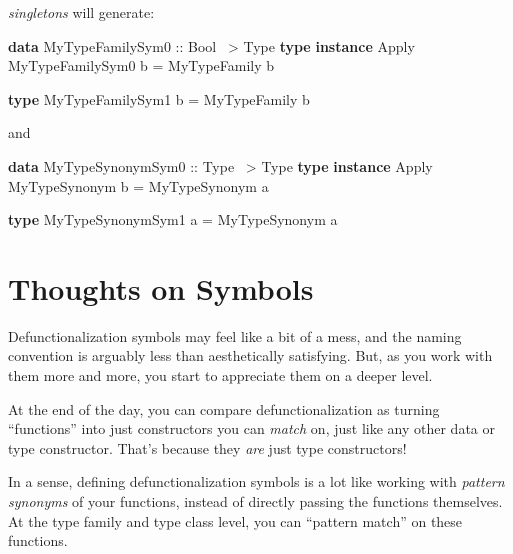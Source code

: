 \documentclass[]{article}
\newenvironment{Shaded}{}{}
\newcommand{\DataTypeTok}[1]{\textcolor[rgb]{0.56,0.13,0.00}{#1}}
\newcommand{\FunctionTok}[1]{\textcolor[rgb]{0.02,0.16,0.49}{#1}}
\newcommand{\KeywordTok}[1]{\textcolor[rgb]{0.00,0.44,0.13}{\textbf{#1}}}
\newcommand{\NormalTok}[1]{#1}
\newcommand{\OtherTok}[1]{\textcolor[rgb]{0.00,0.44,0.13}{#1}}
\begin{document}
\emph{singletons} will generate:

\begin{Shaded}
\begin{Highlighting}[]
\KeywordTok{data} \DataTypeTok{MyTypeFamilySym0}\OtherTok{ ::} \DataTypeTok{Bool} \FunctionTok{~>} \DataTypeTok{Type}
\KeywordTok{type} \KeywordTok{instance} \DataTypeTok{Apply} \DataTypeTok{MyTypeFamilySym0}\NormalTok{ b }\FunctionTok{=} \DataTypeTok{MyTypeFamily}\NormalTok{ b}

\KeywordTok{type} \DataTypeTok{MyTypeFamilySym1}\NormalTok{ b }\FunctionTok{=} \DataTypeTok{MyTypeFamily}\NormalTok{ b}
\end{Highlighting}
\end{Shaded}

and

\begin{Shaded}
\begin{Highlighting}[]
\KeywordTok{data} \DataTypeTok{MyTypeSynonymSym0}\OtherTok{ ::} \DataTypeTok{Type} \FunctionTok{~>} \DataTypeTok{Type}
\KeywordTok{type} \KeywordTok{instance} \DataTypeTok{Apply} \DataTypeTok{MyTypeSynonym}\NormalTok{ b }\FunctionTok{=} \DataTypeTok{MyTypeSynonym}\NormalTok{ a}

\KeywordTok{type} \DataTypeTok{MyTypeSynonymSym1}\NormalTok{ a }\FunctionTok{=} \DataTypeTok{MyTypeSynonym}\NormalTok{ a}
\end{Highlighting}
\end{Shaded}

\hypertarget{thoughts-on-symbols}{%
\section{Thoughts on Symbols}\label{thoughts-on-symbols}}

Defunctionalization symbols may feel like a bit of a mess, and the naming
convention is arguably less than aesthetically satisfying. But, as you work with
them more and more, you start to appreciate them on a deeper level.

At the end of the day, you can compare defunctionalization as turning
``functions'' into just constructors you can \emph{match} on, just like any
other data or type constructor. That's because they \emph{are} just type
constructors!

In a sense, defining defunctionalization symbols is a lot like working with
\emph{pattern synonyms} of your functions, instead of directly passing the
functions themselves. At the type family and type class level, you can ``pattern
match'' on these functions.
\end{document}
